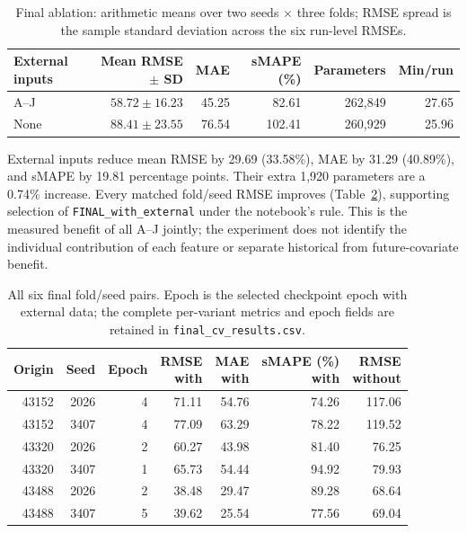 \begin{table}[htbp]
\centering\small
\caption{Final ablation: arithmetic means over two seeds $\times$ three folds; RMSE spread is the sample standard deviation across the six run-level RMSEs.}\label{tab:t2ablation}
\begin{tabular}{lrrrrr}
\toprule
External inputs & Mean RMSE $\pm$ SD & MAE & sMAPE (\%) & Parameters & Min/run\\
\midrule
A--J & $58.72\pm16.23$ & 45.25 & 82.61 & 262,849 & 27.65\\
None & $88.41\pm23.55$ & 76.54 & 102.41 & 260,929 & 25.96\\
\bottomrule
\end{tabular}
\end{table}

External inputs reduce mean RMSE by 29.69 (33.58\%), MAE by 31.29 (40.89\%), and sMAPE by 19.81 percentage points. Their extra 1,920 parameters are a 0.74\% increase. Every matched fold/seed RMSE improves (Table~\ref{tab:t2folds}), supporting selection of \texttt{FINAL\_with\_external} under the notebook's rule. This is the measured benefit of all A--J jointly; the experiment does not identify the individual contribution of each feature or separate historical from future-covariate benefit.

\begin{table}[htbp]
\centering\small
\caption{All six final fold/seed pairs. Epoch is the selected checkpoint epoch with external data; the complete per-variant metrics and epoch fields are retained in \texttt{final\_cv\_results.csv}.}\label{tab:t2folds}
\begin{tabular}{rrrrrrr}
\toprule
Origin & Seed & Epoch & \shortstack{RMSE\\with} & \shortstack{MAE\\with} & \shortstack{sMAPE (\%)\\with} & \shortstack{RMSE\\without}\\
\midrule
43152 & 2026 & 4 & 71.11 & 54.76 & 74.26 & 117.06 \\
43152 & 3407 & 4 & 77.09 & 63.29 & 78.22 & 119.52 \\
43320 & 2026 & 2 & 60.27 & 43.98 & 81.40 & 76.25 \\
43320 & 3407 & 1 & 65.73 & 54.44 & 94.92 & 79.93 \\
43488 & 2026 & 2 & 38.48 & 29.47 & 89.28 & 68.64 \\
43488 & 3407 & 5 & 39.62 & 25.54 & 77.56 & 69.04 \\
\bottomrule
\end{tabular}
\end{table}

